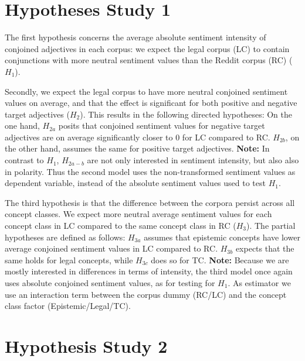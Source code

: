\documentclass{report}
\begin{document}
\section*{Hypotheses Study 1}

The first hypothesis concerns the average absolute sentiment intensity of conjoined adjectives in each corpus: we expect the legal corpus (LC) to contain conjunctions with more neutral sentiment values than the Reddit corpus (RC) ($H_1$).

Secondly, we expect the legal corpus to have more neutral conjoined sentiment values on average, and that the effect is significant for both positive and negative target adjectives ($H_2$). This results in the following directed hypotheses: On the one hand, $H_{2a}$ posits that conjoined sentiment values for negative target adjectives are on average significantly closer to 0 for LC compared to RC. $H_{2b}$, on the other hand, assumes the same for positive target adjectives. \textbf{Note:} In contrast to $H_1$, $H_{2a-b}$ are not only interested in sentiment intensity, but also also in polarity. Thus the second model uses the non-transformed sentiment values as dependent variable, instead of the absolute sentiment values used to test $H_1$.

The third hypothesis is that the difference between the corpora persist across all concept classes. We expect more neutral average sentiment values for each concept class in LC compared to the same concept class in RC ($H_3$). The partial hypotheses are defined as follows: $H_{3a}$ assumes that epistemic concepts have lower average conjoined sentiment values in LC compared to RC. $H_{3b}$ expects that the same holds for legal concepts, while $H_{3c}$ does so for TC. \textbf{Note:} Because we are mostly interested in differences in terms of intensity, the third model once again uses absolute conjoined sentiment values, as for testing for $H_1$. As estimator we use an interaction term between the corpus dummy (RC/LC) and the concept class factor (Epistemic/Legal/TC).

\section*{Hypothesis Study 2}
\end{document}
